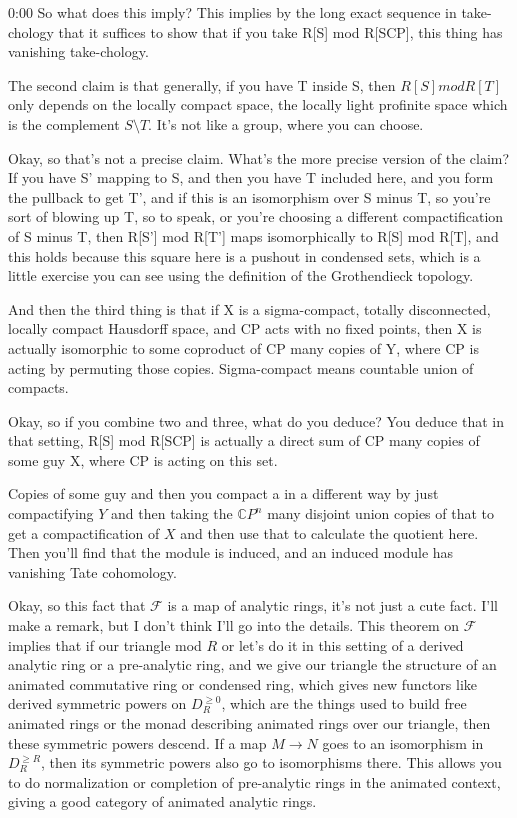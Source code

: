 \begin{unfinished}{0:00}
So what does this imply? This implies by the long exact sequence in take-chology that it suffices to show that if you take R[S] mod R[SCP], this thing has vanishing take-chology.

The second claim is that generally, if you have T inside S, then $R[S] mod R[T]$ only depends on the locally compact space, the locally light profinite space which is the complement $S\setminus T$. It's not like a group, where you can choose.

Okay, so that's not a precise claim. What's the more precise version of the claim? If you have S' mapping to S, and then you have T included here, and you form the pullback to get T', and if this is an isomorphism over S minus T, so you're sort of blowing up T, so to speak, or you're choosing a different compactification of S minus T, then R[S'] mod R[T'] maps isomorphically to R[S] mod R[T], and this holds because this square here is a pushout in condensed sets, which is a little exercise you can see using the definition of the Grothendieck topology.

And then the third thing is that if X is a sigma-compact, totally disconnected, locally compact Hausdorff space, and CP acts with no fixed points, then X is actually isomorphic to some coproduct of CP many copies of Y, where CP is acting by permuting those copies. Sigma-compact means countable union of compacts.

Okay, so if you combine two and three, what do you deduce? You deduce that in that setting, R[S] mod R[SCP] is actually a direct sum of CP many copies of some guy X, where CP is acting on this set.

Copies of some guy and then you compact a in a different way by just compactifying $Y$ and then taking the $\mathbb{C}P^n$ many disjoint union copies of that to get a compactification of $X$ and then use that to calculate the quotient here. Then you'll find that the module is induced, and an induced module has vanishing Tate cohomology.

Okay, so this fact that $\mathcal{F}$ is a map of analytic rings, it's not just a cute fact. I'll make a remark, but I don't think I'll go into the details. This theorem on $\mathcal{F}$ implies that if our triangle mod $R$ or let's do it in this setting of a derived analytic ring or a pre-analytic ring, and we give our triangle the structure of an animated commutative ring or condensed ring, which gives new functors like derived symmetric powers on $D^{\geq 0}_R$, which are the things used to build free animated rings or the monad describing animated rings over our triangle, then these symmetric powers descend. If a map $M \to N$ goes to an isomorphism in $D^{\geq R}_R$, then its symmetric powers also go to isomorphisms there. This allows you to do normalization or completion of pre-analytic rings in the animated context, giving a good category of animated analytic rings.


\end{unfinished}
